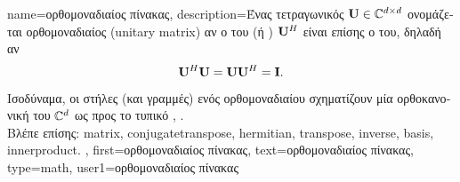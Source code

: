 {name={\foreignlanguage{greek}{ορθομοναδιαίος πίνακας}},
	description={\foreignlanguage{greek}{Ένας τετραγωνικός}  $\mathbf{U} \in \mathbb{C}^{d \times d}$ 
		\foreignlanguage{greek}{ονομάζεται ορθομοναδιαίος} (unitary matrix) 
		\foreignlanguage{greek}{αν ο}  \foreignlanguage{greek}{του (ή}
		 ) $\mathbf{U}^{H}$ \foreignlanguage{greek}{είναι επίσης ο}  
		\foreignlanguage{greek}{του, δηλαδή αν}
 		\[
 			\mathbf{U}^{H} \mathbf{U} = \mathbf{U} \mathbf{U}^{H} = \mathbf{I}.
 		\]
 		\foreignlanguage{greek}{Ισοδύναμα, οι στήλες (και γραμμές) ενός ορθομοναδιαίου}  
		\foreignlanguage{greek}{σχηματίζουν μία ορθοκανονική}  \foreignlanguage{greek}{του $\mathbb{C}^{d}$ 
		ως προς το τυπικό}  \cite{Axler2025}, \cite{HornMatAnalysis}. 
 		\\
 		\foreignlanguage{greek}{Βλέπε επίσης:} \gls{matrix}, \gls{conjugatetranspose}, \gls{hermitian}, \gls{transpose}, \gls{inverse}, 
		\gls{basis}, \gls{innerproduct}. },
 	first={\foreignlanguage{greek}{ορθομοναδιαίος πίνακας}},
 	text={\foreignlanguage{greek}{ορθομοναδιαίος πίνακας}},
	type=math,
	user1={\foreignlanguage{greek}{ορθομοναδιαίος πίνακας}} %
}%

